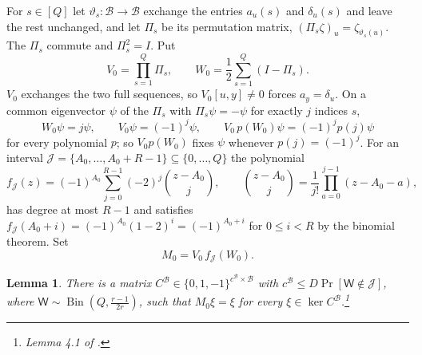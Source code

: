 \documentclass[11pt,reqno]{amsart}
\numberwithin{equation}{section}
\theoremstyle{plain}
\newtheorem{lemma}[theorem]{Lemma}
\theoremstyle{definition}
\theoremstyle{remark}
\DeclareMathOperator{\Bin}{Bin}
\newcommand{\B}{\mathcal{B}}
\begin{document}
For $s\in[Q]$ let $\vartheta_s:\B\to\B$ exchange the entries $a_u(s)$ and
$\delta_u(s)$ and leave the rest unchanged, and let $\Pi_s$ be its permutation
matrix, $(\Pi_s\zeta)_u=\zeta_{\vartheta_s(u)}$. The $\Pi_s$ commute and
$\Pi_s^2=I$. Put
\begin{equation}\label{eq:V0W0}
  V_0=\prod_{s=1}^{Q}\Pi_s,\qquad W_0=\frac12\sum_{s=1}^{Q}(I-\Pi_s).
\end{equation}
$V_0$ exchanges the two full sequences, so $V_0[u,y]\ne0$ forces $a_y=\delta_u$.
On a common eigenvector $\psi$ of the $\Pi_s$ with $\Pi_s\psi=-\psi$ for exactly
$j$ indices $s$,
\begin{equation}\label{eq:eigen}
  W_0\psi=j\psi,\qquad V_0\psi=(-1)^j\psi,\qquad V_0\,p(W_0)\psi=(-1)^jp(j)\psi
\end{equation}
for every polynomial $p$; so $V_0p(W_0)$ fixes $\psi$ whenever $p(j)=(-1)^j$.
For an interval $\mathcal J=\{A_0,\dots,A_0+R-1\}\subseteq\{0,\dots,Q\}$ the
polynomial
\begin{equation}\label{eq:fI}
  f_{\mathcal J}(z)=(-1)^{A_0}\sum_{j=0}^{R-1}(-2)^j\binom{z-A_0}{j},\qquad
  \binom{z-A_0}{j}=\frac1{j!}\prod_{a=0}^{j-1}(z-A_0-a),
\end{equation}
has degree at most $R-1$ and satisfies $f_{\mathcal J}(A_0+i)=(-1)^{A_0}(1-2)^i=(-1)^{A_0+i}$
for $0\le i<R$ by the binomial theorem. Set
\begin{equation}\label{eq:M0}
  M_0=V_0\,f_{\mathcal J}(W_0).
\end{equation}

\begin{lemma}\label{lem:CB}
There is a matrix $C^{\B}\in\{0,1,-1\}^{c^{\B}\times\B}$ with
$c^{\B}\le D\Pr[\mathsf W\notin\mathcal J]$, where $\mathsf W\sim\Bin(Q,\frac{r-1}{2r})$,
such that $M_0\xi=\xi$ for every $\xi\in\ker C^{\B}$.\footnote{Lemma 4.1 of
\cite{OAI26}.}
\end{lemma}
\end{document}
